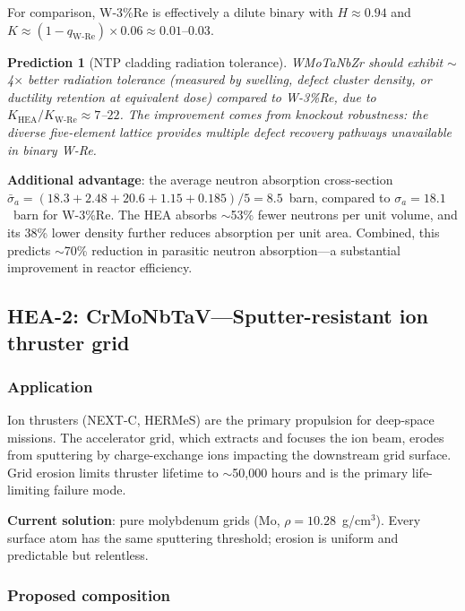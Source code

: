 \documentclass[12pt,letterpaper]{article}
\newtheorem{prediction}[theorem]{Prediction}
\theoremstyle{definition}
\begin{document}
For comparison, W-3\%Re is effectively a dilute binary with $H \approx 0.94$ and $K \approx (1-q_{\mathrm{W\text{-}Re}}) \times 0.06 \approx 0.01$--$0.03$.

\begin{prediction}[NTP cladding radiation tolerance]
WMoTaNbZr should exhibit $\sim$4$\times$ better radiation tolerance (measured by swelling, defect cluster density, or ductility retention at equivalent dose) compared to W-3\%Re, due to $K_{\mathrm{HEA}}/K_{\mathrm{W\text{-}Re}} \approx 7$--$22$.  The improvement comes from knockout robustness: the diverse five-element lattice provides multiple defect recovery pathways unavailable in binary W-Re.
\end{prediction}

\textbf{Additional advantage}: the average neutron absorption cross-section $\bar{\sigma}_a = (18.3 + 2.48 + 20.6 + 1.15 + 0.185)/5 = 8.5$~barn, compared to $\sigma_a = 18.1$~barn for W-3\%Re.  The HEA absorbs $\sim$53\% fewer neutrons per unit volume, and its 38\% lower density further reduces absorption per unit area.  Combined, this predicts $\sim$70\% reduction in parasitic neutron absorption---a substantial improvement in reactor efficiency.


\subsection{HEA-2: CrMoNbTaV---Sputter-resistant ion thruster grid}

\subsubsection{Application}

Ion thrusters (NEXT-C, HERMeS) are the primary propulsion for deep-space missions.  The accelerator grid, which extracts and focuses the ion beam, erodes from sputtering by charge-exchange ions impacting the downstream grid surface.  Grid erosion limits thruster lifetime to $\sim$50,000 hours and is the primary life-limiting failure mode.

\textbf{Current solution}: pure molybdenum grids (Mo, $\rho = 10.28$~g/cm$^3$).  Every surface atom has the same sputtering threshold; erosion is uniform and predictable but relentless.

\subsubsection{Proposed composition}
\end{document}
